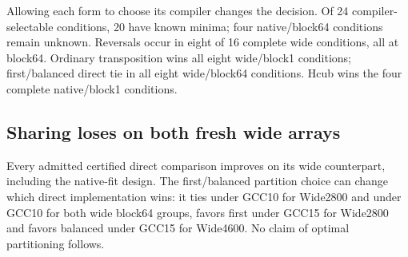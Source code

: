 \documentclass[conference]{IEEEtran}
\begin{document}
Allowing each form to choose its compiler changes the decision. Of 24
compiler-selectable conditions, 20 have known minima; four
native/block64 conditions remain unknown. Reversals occur in eight of 16
complete wide conditions, all at block64. Ordinary transposition wins
all eight wide/block1 conditions; first/balanced direct tie in all eight
wide/block64 conditions. Hcub wins the four complete native/block1
conditions.

\subsection{Sharing loses on both fresh wide arrays}\label{sharing-loses-on-both-fresh-wide-arrays}

Every admitted certified direct comparison improves on its wide
counterpart, including the native-fit design. The first/balanced
partition choice can change which direct implementation wins: it ties
under GCC10 for Wide2800 and under GCC10 for both wide block64 groups,
favors first under GCC15 for Wide2800 and favors balanced under GCC15
for Wide4600. No claim of optimal partitioning follows.
\end{document}

